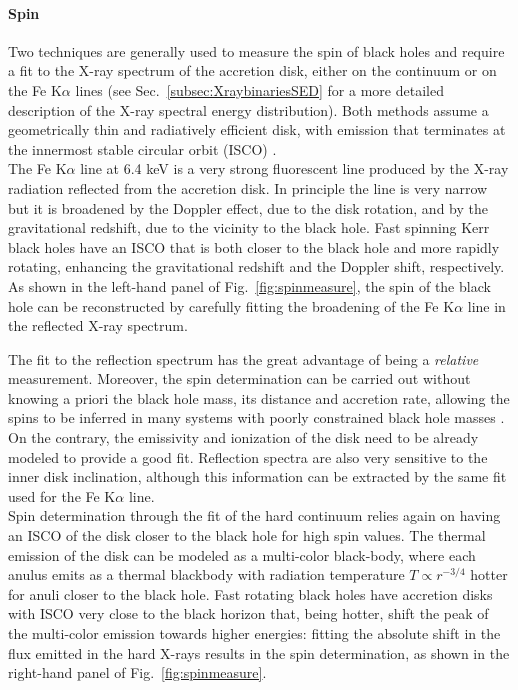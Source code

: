 \documentclass[a4paper,titlepage]{book}     	%
\begin{document}
\paragraph{Spin}
Two techniques are generally used to measure the spin of black holes and require a fit to the X-ray spectrum of the accretion disk, either on the continuum or on the Fe K$\alpha$ lines (see Sec.\ \ref{subsec:XraybinariesSED} for a more detailed description of the X-ray spectral energy distribution). Both methods assume a geometrically thin and radiatively efficient disk, with emission that terminates at the innermost stable circular orbit (ISCO) \cite{Xbinaries_spinBHmeasure}.\\

The Fe K$\alpha$ line at 6.4 keV is a very strong fluorescent line produced by the X-ray radiation reflected from the accretion disk. In principle the line is very narrow but it is broadened by the Doppler effect, due to the disk rotation, and by the gravitational redshift, due to the vicinity to the black hole. Fast spinning Kerr black holes have an ISCO that is both closer to the black hole and more rapidly rotating, enhancing the gravitational redshift and the Doppler shift, respectively. As shown in the left-hand panel of Fig.\ \ref{fig:spinmeasure}, the spin of the black hole can be reconstructed by carefully fitting the broadening of the Fe K$\alpha$ line in the reflected X-ray spectrum.

The fit to the reflection spectrum has the great advantage of being a \textit{relative} measurement. Moreover, the spin determination can be carried out without knowing a priori the black hole mass, its distance and accretion rate, allowing the spins to be inferred in many systems with poorly constrained black hole masses \cite{HMXBH_spins2021}. On the contrary, the emissivity and ionization of the disk need to be already modeled to provide a good fit. Reflection spectra are also very sensitive to the inner disk inclination, although this information can be extracted by the same fit used for the Fe K$\alpha$ line.\\

Spin determination through the fit of the hard continuum relies again on having an ISCO of the disk closer to the black hole for high spin values. The thermal emission of the disk can be modeled as a multi-color black-body, where each anulus emits as a thermal blackbody with radiation temperature $T \propto r^{-3/4}$ hotter for anuli closer to the black hole. Fast rotating black holes have accretion disks with ISCO very close to the black horizon that, being hotter, shift the peak of the multi-color emission towards higher energies: fitting the absolute shift in the flux emitted in the hard X-rays results in the spin determination, as shown in the right-hand panel of Fig.\ \ref{fig:spinmeasure}.
\end{document}
